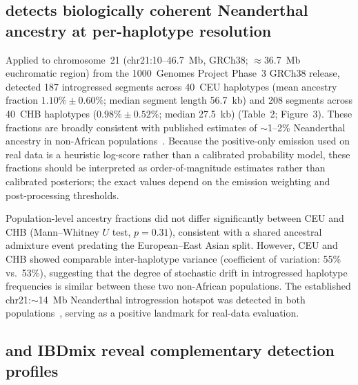 \subsection*{\AP{} detects biologically coherent Neanderthal ancestry at per-haplotype resolution}

Applied to chromosome~21 (chr21:10--46.7~Mb, GRCh38; $\approx$36.7~Mb euchromatic region) from the
1000~Genomes Project Phase~3 GRCh38 release, \AP{} detected 187 introgressed segments
across 40~CEU haplotypes (mean ancestry fraction $1.10\% \pm 0.60\%$;
median segment length 56.7~kb) and 208 segments across 40~CHB haplotypes
($0.98\% \pm 0.52\%$; median 27.5~kb) (Table~2; Figure~3).
These fractions are broadly consistent with published estimates of $\sim$1--2\%
Neanderthal ancestry in non-African populations~\citep{prufer2014complete, sankararaman2014genomic}.
Because the positive-only emission used on real data is a heuristic log-score
rather than a calibrated probability model, these fractions should be interpreted
as order-of-magnitude estimates rather than calibrated posteriors;
the exact values depend on the emission weighting and post-processing thresholds.

Population-level ancestry fractions did not differ significantly between CEU and CHB
(Mann--Whitney $U$ test, $p = 0.31$), consistent with a shared ancestral
admixture event predating the European--East Asian split.
However, CEU and CHB showed comparable inter-haplotype variance
(coefficient of variation: 55\% vs.~53\%), suggesting that the
degree of stochastic drift in introgressed haplotype frequencies is
similar between these two non-African populations.
The established chr21:$\sim$14~Mb Neanderthal introgression hotspot was
detected in both populations~\citep{vernot2014resurrecting, sankararaman2014genomic, vernot2016excavating},
serving as a positive landmark for real-data evaluation.

\subsection*{\AP{} and IBDmix reveal complementary detection profiles}

